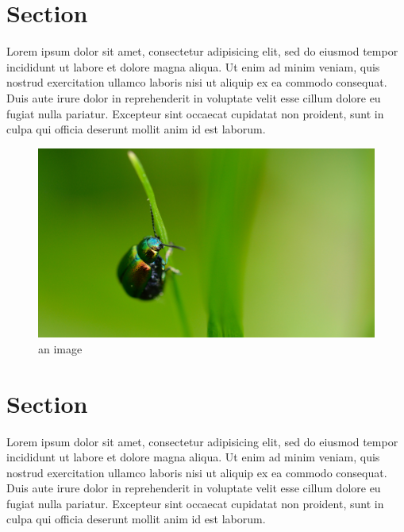 \documentclass[a5paper, 10pt]{book}
\begin{document}
	\section{Section}

	Lorem ipsum dolor sit amet, consectetur adipisicing elit, sed do eiusmod tempor incididunt ut labore et dolore magna aliqua. Ut enim ad minim veniam, quis nostrud exercitation ullamco laboris nisi ut aliquip ex ea commodo consequat. Duis aute irure dolor in reprehenderit in voluptate velit esse cillum dolore eu fugiat nulla pariatur. Excepteur sint occaecat cupidatat non proident, sunt in culpa qui officia deserunt mollit anim id est laborum.

	\begin{figure}
		\includegraphics{test.jpg}
		\caption{an image}
	\end{figure}

	\section{Section}

	Lorem ipsum dolor sit amet, consectetur adipisicing elit, sed do eiusmod tempor incididunt ut labore et dolore magna aliqua. Ut enim ad minim veniam, quis nostrud exercitation ullamco laboris nisi ut aliquip ex ea commodo consequat. Duis aute irure dolor in reprehenderit in voluptate velit esse cillum dolore eu fugiat nulla pariatur. Excepteur sint occaecat cupidatat non proident, sunt in culpa qui officia deserunt mollit anim id est laborum.
\end{document}

